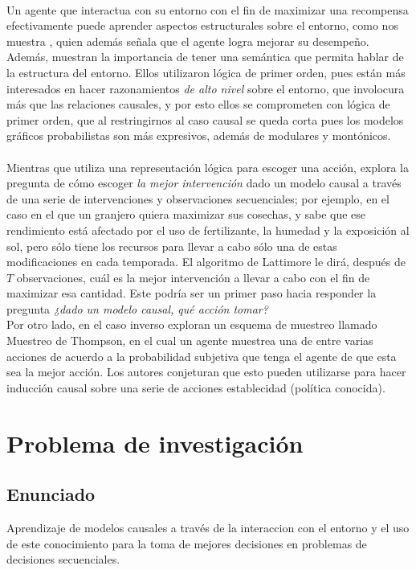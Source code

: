 \documentclass[11pt]{article}
\theoremstyle{plain}
\begin{document}
\\
Un agente que interactua con su entorno con el fin de maximizar una recompensa efectivamente puede aprender aspectos estructurales sobre el entorno, como nos muestra \cite{garnelo2016towards}, quien además señala que el agente logra mejorar su desempeño. Además, muestran la importancia de tener una semántica que permita hablar de la estructura del entorno. Ellos utilizaron lógica de primer orden, pues están más interesados en hacer razonamientos \textit{de alto nivel} sobre el entorno, que involocura más que las relaciones causales, y por esto ellos se comprometen con lógica de primer orden, que al restringirnos al caso causal se queda corta pues los modelos gráficos probabilistas son más expresivos, además de modulares y montónicos.\\
\\
Mientras que \cite{garnelo2016towards} utiliza una representación lógica para escoger una acción, \cite{lattimoreNIPS2016} explora la pregunta de cómo escoger \textit{la mejor intervención} dado un modelo causal a través de una serie de intervenciones y observaciones secuenciales; por ejemplo, en el caso en el que un granjero quiera maximizar sus cosechas, y sabe que ese rendimiento está afectado por el uso de fertilizante, la humedad y la exposición al sol, pero sólo tiene los recursos para llevar a cabo sólo una de estas modificaciones en cada temporada. El algoritmo de Lattimore le dirá, después de $T$ observaciones, cuál es la mejor intervención a llevar a cabo con el fin de maximizar esa cantidad. Este podría ser un primer paso hacia responder la pregunta \textit{¿dado un modelo causal, qué acción tomar?}
\\
Por otro lado, en el caso inverso \cite{ortega2014generalized} exploran un esquema de muestreo llamado Muestreo de Thompson, en el cual un agente muestrea una de entre varias acciones de acuerdo a la probabilidad subjetiva que tenga el agente de que esta sea la mejor acción. Los autores conjeturan que esto pueden utilizarse para hacer inducción causal sobre una serie de acciones establecidad (política conocida).

\section{Problema de investigación}
\subsection{Enunciado}
Aprendizaje de modelos causales a través de la interaccion con el entorno y el uso de este conocimiento para la toma de mejores decisiones en problemas de decisiones secuenciales.
\end{document}
